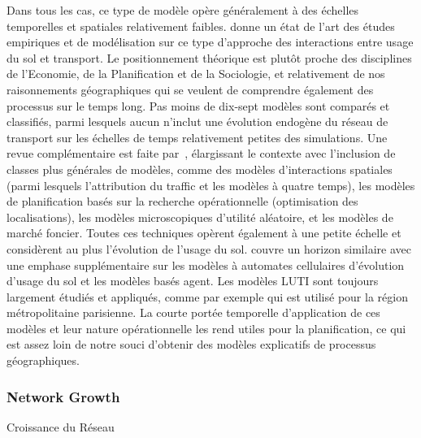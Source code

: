 {Dans tous les cas, ce type de modèle opère généralement à des échelles temporelles et spatiales relativement faibles.  \cite{wegener2004land} donne un état de l'art des études empiriques et de modélisation sur ce type d'approche des interactions entre usage du sol et transport. Le positionnement théorique est plutôt proche des disciplines de l'Economie, de la Planification et de la Sociologie, et relativement de nos raisonnements géographiques qui se veulent de comprendre également des processus sur le temps long.
 Pas moins de dix-sept modèles sont comparés et classifiés, parmi lesquels aucun n'inclut une évolution endogène du réseau de transport sur les échelles de temps relativement petites des simulations. Une revue complémentaire est faite par~\cite{chang2006models}, élargissant le contexte avec l'inclusion de classes plus générales de modèles, comme des modèles d'interactions spatiales (parmi lesquels l'attribution du traffic et les modèles à quatre temps), les modèles de planification basés sur la recherche opérationnelle (optimisation des localisations), les modèles microscopiques d'utilité aléatoire, et les modèles de marché foncier. Toutes ces techniques opèrent également à une petite échelle et considèrent au plus l'évolution de l'usage du sol. \cite{iacono2008models} couvre un horizon similaire avec une emphase supplémentaire sur les modèles à automates cellulaires d'évolution d'usage du sol et les modèles basés agent. Les modèles LUTI sont toujours largement étudiés et appliqués, comme par exemple \cite{delons:hal-00319087} qui est utilisé pour la région métropolitaine parisienne. La courte portée temporelle d'application de ces modèles et leur nature opérationnelle les rend utiles pour la planification, 
 ce qui est assez loin de notre souci d'obtenir des modèles explicatifs de processus géographiques.
}




\subsubsection{Network Growth}{Croissance du Réseau}

 
